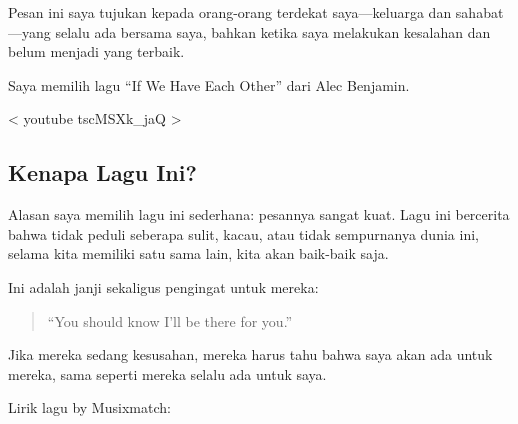 \documentclass[
  letterpaper,
  DIV=11,
  numbers=noendperiod]{scrreprt}
\begin{document}
Pesan ini saya tujukan kepada orang-orang terdekat saya---keluarga dan
sahabat---yang selalu ada bersama saya, bahkan ketika saya melakukan
kesalahan dan belum menjadi yang terbaik.

Saya memilih lagu ``If We Have Each Other'' dari Alec Benjamin.

{{< youtube tscMSXk_jaQ >}}

\subsection{Kenapa Lagu Ini?}\label{kenapa-lagu-ini}

Alasan saya memilih lagu ini sederhana: pesannya sangat kuat. Lagu ini
bercerita bahwa tidak peduli seberapa sulit, kacau, atau tidak
sempurnanya dunia ini, selama kita memiliki satu sama lain, kita akan
baik-baik saja.

Ini adalah janji sekaligus pengingat untuk mereka:

\begin{quote}
``You should know I'll be there for you.''
\end{quote}

Jika mereka sedang kesusahan, mereka harus tahu bahwa saya akan ada
untuk mereka, sama seperti mereka selalu ada untuk saya.

Lirik lagu by Musixmatch:
\end{document}
